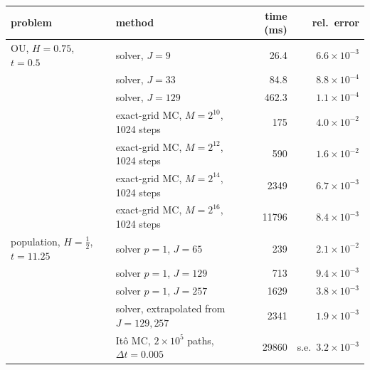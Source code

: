 \begin{tabular}{llrr}\toprule
problem & method & time (ms) & rel.\ error\\\midrule
OU, $H=0.75$, $t=0.5$ & solver, $J=9$ & 26.4 & $6.6\times10^{-3}$ \\
 & solver, $J=33$ & 84.8 & $8.8\times10^{-4}$ \\
 & solver, $J=129$ & 462.3 & $1.1\times10^{-4}$ \\
 & exact-grid MC, $M=2^{10}$, 1024 steps & 175 & $4.0\times10^{-2}$ \\
 & exact-grid MC, $M=2^{12}$, 1024 steps & 590 & $1.6\times10^{-2}$ \\
 & exact-grid MC, $M=2^{14}$, 1024 steps & 2349 & $6.7\times10^{-3}$ \\
 & exact-grid MC, $M=2^{16}$, 1024 steps & 11796 & $8.4\times10^{-3}$ \\
\addlinespace
population, $H=\frac12$, $t=11.25$ & solver $p=1$, $J=65$ & 239 & $2.1\times10^{-2}$ \\
 & solver $p=1$, $J=129$ & 713 & $9.4\times10^{-3}$ \\
 & solver $p=1$, $J=257$ & 1629 & $3.8\times10^{-3}$ \\
 & solver, extrapolated from $J=129,257$ & 2341 & $1.9\times10^{-3}$ \\
 & It\^o MC, $2\times10^5$ paths, $\Delta t=0.005$ & 29860 & s.e.\ $3.2\times10^{-3}$ \\
\bottomrule\end{tabular}
